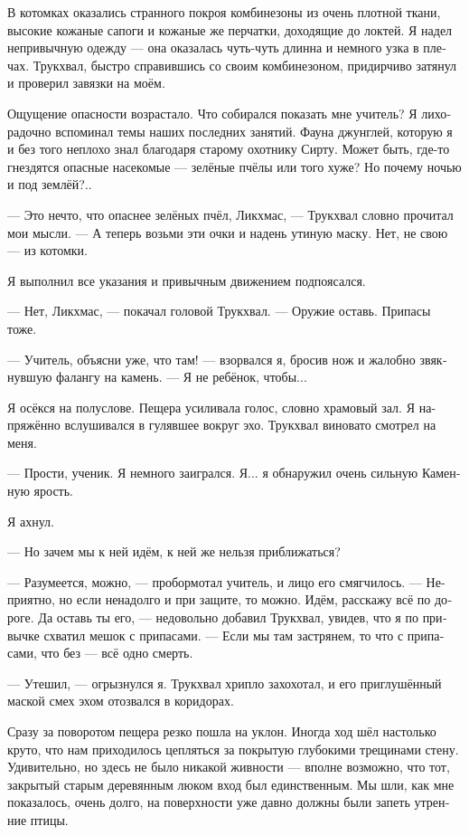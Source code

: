 \documentclass[a4paper,12pt,fleqn]{book}\usepackage{polyglossia}\setdefaultlanguage[babelshorthands=true]{russian}\setotherlanguage{english}\defaultfontfeatures{Ligatures=TeX,Mapping=tex-text}\usepackage{xcolor}\newcommand{\ml}[3]{#2}
\newcommand{\asterism}{\vspace{1em}{\centering\Large\bfseries$\ast~\ast~\ast$\par}\vspace{1em}}
\begin{document}
{В котомках оказались странного покроя комбинезоны из очень плотной ткани, высокие кожаные сапоги и кожаные же перчатки, доходящие до локтей.
Я надел непривычную одежду --- она оказалась чуть-чуть длинна и немного узка в плечах.
Трукхвал, быстро справившись со своим комбинезоном, придирчиво затянул и проверил завязки на моём.

Ощущение опасности возрастало.
Что собирался показать мне учитель?
Я лихорадочно вспоминал темы наших последних занятий.
Фауна джунглей, которую я и без того неплохо знал благодаря старому охотнику Сирту.
Может быть, где-то гнездятся опасные насекомые --- зелёные пчёлы или того хуже?
Но почему ночью и под землёй?..

--- Это нечто, что опаснее зелёных пчёл, Ликхмас, --- Трукхвал словно прочитал мои мысли.
--- А теперь возьми эти очки и надень утиную маску.
Нет, не свою --- из котомки.

Я выполнил все указания и привычным движением подпоясался.

--- Нет, Ликхмас, --- покачал головой Трукхвал.
--- Оружие оставь.
Припасы тоже.

--- Учитель, объясни уже, что там! --- взорвался я, бросив нож и жалобно звякнувшую фалангу на камень.
--- Я не ребёнок, чтобы...

Я осёкся на полуслове.
Пещера усиливала голос, словно храмовый зал.
Я напряжённо вслушивался в гулявшее вокруг эхо.
Трукхвал виновато смотрел на меня.

--- Прости, ученик.
Я немного заигрался.
Я... я обнаружил очень сильную Каменную ярость.

Я ахнул.

--- Но зачем мы к ней идём, к ней же нельзя приближаться?

--- Разумеется, можно, --- пробормотал учитель, и лицо его смягчилось.
--- Неприятно, но если ненадолго и при защите, то можно.
Идём, расскажу всё по дороге.
Да оставь ты его, --- недовольно добавил Трукхвал, увидев, что я по привычке схватил мешок с припасами.
--- Если мы там застрянем, то что с припасами, что без --- всё одно смерть.

--- Утешил, --- огрызнулся я.
Трукхвал хрипло захохотал, и его приглушённый маской смех эхом отозвался в коридорах.

\asterism

Сразу за поворотом пещера резко пошла на уклон.
Иногда ход шёл настолько круто, что нам приходилось цепляться за покрытую глубокими трещинами стену.
Удивительно, но здесь не было никакой живности --- вполне возможно, что тот, закрытый старым деревянным люком вход был единственным.
Мы шли, как мне показалось, очень долго, на поверхности уже давно должны были запеть утренние птицы.

}
\end{document}
